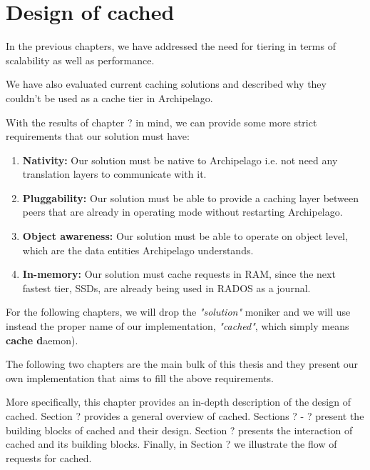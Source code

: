 \chapter{Design of cached}\label{ch:cached-design}

In the previous chapters, we have addressed the need for tiering in terms of
scalability as well as performance. %

We have also evaluated current caching solutions and described why they couldn't 
be used as a cache tier in Archipelago. %

With the results of chapter ? in mind, we can provide some more strict 
requirements that our solution must have:

\begin{enumerate}
	\item \textbf{Nativity:} Our solution must be native to Archipelago i.e.  
		not need any translation layers to communicate with it.
	\item \textbf{Pluggability:} Our solution must be able to provide a 
		caching layer between peers that are already in operating mode 
		without restarting Archipelago.
	\item \textbf{Object awareness:} Our solution must be able to operate on 
		object level, which are the data entities Archipelago 
		understands.
	\item \textbf{In-memory:} Our solution must cache requests in RAM, since 
		the next fastest tier, SSDs, are already being used in RADOS as 
		a journal.
\end{enumerate}

For the following chapters, we will drop the \textit{"solution"} moniker and we 
will use instead the proper name of our implementation, \emph{"cached"}, which 
simply means \textbf{cache d}aemon).

The following two chapters are the main bulk of this thesis and they present our 
own implementation that aims to fill the above requirements.

More specifically, this chapter provides an in-depth description of the design 
of cached.  Section ? provides a general overview of cached. Sections ? - ?  
present the building blocks of cached and their design. Section ? presents the 
interaction of cached and its building blocks. Finally, in Section ?  we 
illustrate the flow of requests for cached.

